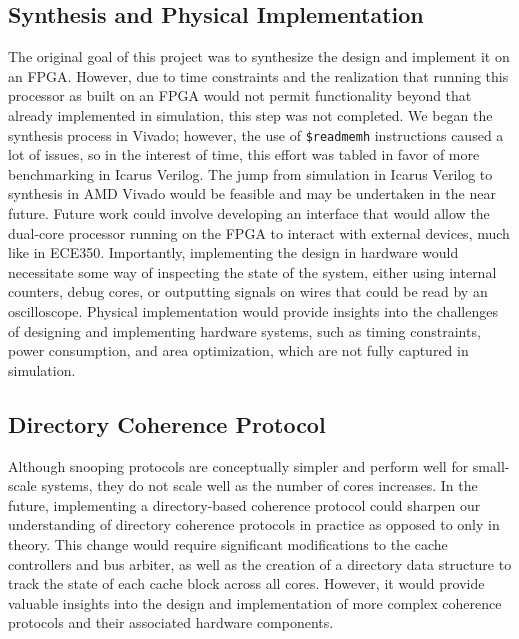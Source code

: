 \documentclass[10pt, compsoc]{IEEEtran}
\begin{document}
\subsection*{Synthesis and Physical Implementation}

The original goal of this project was to synthesize the design and implement it on an FPGA. However, due to time constraints and the realization that running this processor as built on an FPGA would not permit functionality beyond that already implemented in simulation, this step was not completed. We began the synthesis process in Vivado; however, the use of \texttt{\$readmemh} instructions caused a lot of issues, so in the interest of time, this effort was tabled in favor of more benchmarking in Icarus Verilog. The jump from simulation in Icarus Verilog to synthesis in AMD Vivado would be feasible and may be undertaken in the near future. Future work could involve developing an interface that would allow the dual-core processor running on the FPGA to interact with external devices, much like in ECE350. Importantly, implementing the design in hardware would necessitate some way of inspecting the state of the system, either using internal counters, debug cores, or outputting signals on wires that could be read by an oscilloscope. Physical implementation would provide insights into the challenges of designing and implementing hardware systems, such as timing constraints, power consumption, and area optimization, which are not fully captured in simulation.



\subsection*{Directory Coherence Protocol} 

Although snooping protocols are conceptually simpler and perform well for small-scale systems, they do not scale well as the number of cores increases. In the future, implementing a directory-based coherence protocol could sharpen our understanding of directory coherence protocols in practice as opposed to only in theory. This change would require significant modifications to the cache controllers and bus arbiter, as well as the creation of a directory data structure to track the state of each cache block across all cores. However, it would provide valuable insights into the design and implementation of more complex coherence protocols and their associated hardware components.
\end{document}
